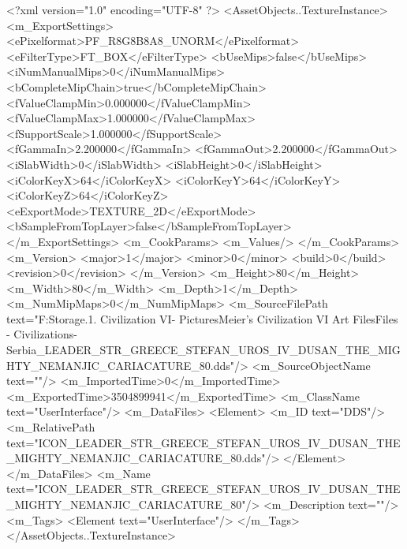 <?xml version="1.0" encoding="UTF-8" ?>
<AssetObjects..TextureInstance>
	<m_ExportSettings>
		<ePixelformat>PF_R8G8B8A8_UNORM</ePixelformat>
		<eFilterType>FT_BOX</eFilterType>
		<bUseMips>false</bUseMips>
		<iNumManualMips>0</iNumManualMips>
		<bCompleteMipChain>true</bCompleteMipChain>
		<fValueClampMin>0.000000</fValueClampMin>
		<fValueClampMax>1.000000</fValueClampMax>
		<fSupportScale>1.000000</fSupportScale>
		<fGammaIn>2.200000</fGammaIn>
		<fGammaOut>2.200000</fGammaOut>
		<iSlabWidth>0</iSlabWidth>
		<iSlabHeight>0</iSlabHeight>
		<iColorKeyX>64</iColorKeyX>
		<iColorKeyY>64</iColorKeyY>
		<iColorKeyZ>64</iColorKeyZ>
		<eExportMode>TEXTURE_2D</eExportMode>
		<bSampleFromTopLayer>false</bSampleFromTopLayer>
	</m_ExportSettings>
	<m_CookParams>
		<m_Values/>
	</m_CookParams>
	<m_Version>
		<major>1</major>
		<minor>0</minor>
		<build>0</build>
		<revision>0</revision>
	</m_Version>
	<m_Height>80</m_Height>
	<m_Width>80</m_Width>
	<m_Depth>1</m_Depth>
	<m_NumMipMaps>0</m_NumMipMaps>
	<m_SourceFilePath text="F:\Mod Storage\2.1. Civilization VI\Mods\Archive - Pictures\Sid Meier's Civilization VI Art Files\Art Files - Civilizations\Civilization - Serbia\ICON_LEADER_STR_GREECE_STEFAN_UROS_IV_DUSAN_THE_MIGHTY_NEMANJIC_CARIACATURE_80.dds"/>
	<m_SourceObjectName text=""/>
	<m_ImportedTime>0</m_ImportedTime>
	<m_ExportedTime>3504899941</m_ExportedTime>
	<m_ClassName text="UserInterface"/>
	<m_DataFiles>
		<Element>
			<m_ID text="DDS"/>
			<m_RelativePath text="ICON_LEADER_STR_GREECE_STEFAN_UROS_IV_DUSAN_THE_MIGHTY_NEMANJIC_CARIACATURE_80.dds"/>
		</Element>
	</m_DataFiles>
	<m_Name text="ICON_LEADER_STR_GREECE_STEFAN_UROS_IV_DUSAN_THE_MIGHTY_NEMANJIC_CARIACATURE_80"/>
	<m_Description text=""/>
	<m_Tags>
		<Element text="UserInterface"/>
	</m_Tags>
</AssetObjects..TextureInstance>

